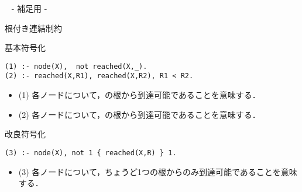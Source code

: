 \appendix
\backupbegin

\begin{frame}{~}
 \centering
 - 補足用 -
\end{frame} 

\begin{frame}[fragile]{根付き連結制約}
\begin{exampleblock}{基本符号化}\small
\begin{lstlisting}
(1) :- node(X),  not reached(X,_).
(2) :- reached(X,R1), reached(X,R2), R1 < R2.
\end{lstlisting}
\end{exampleblock}
\vfill
\begin{itemize}
\item (1) 各ノードについて，の根から到達可能であることを意味する．
\item (2) 各ノードについて，の根から到達可能であることを意味する．
\end{itemize}
\begin{exampleblock}{改良符号化}\small
\begin{lstlisting}
(3) :- node(X), not 1 { reached(X,R) } 1.
\end{lstlisting}
\end{exampleblock}
\vfill
\begin{itemize}
\item (3) 各ノードについて，ちょうど1つの根からのみ到達可能であることを意味する．
\end{itemize}
\end{frame}

